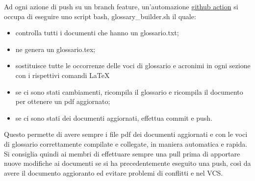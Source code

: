                 Ad ogni azione di push su un branch feature, un'automazione \href{https://docs.github.com/en/free-pro-team@latest/actions}{github action} si occupa di eseguire uno script bash, glossary\_builder.sh il quale:
                \begin{itemize}
                    \item controlla tutti i documenti che hanno un glossario.txt;
                    \item ne genera un glossario.tex;
                    \item sostituisce tutte le occorrenze delle voci di glossario e acronimi in ogni sezione con i rispettivi comandi \LaTeX{}
                    \item se ci sono stati cambiamenti, ricompila il glossario e ricompila il documento per ottenere un pdf aggiornato;
                    \item se ci sono stati dei documenti aggiornati, effettua commit e push.
                \end{itemize}
                Questo permette di avere sempre i file pdf dei documenti aggiornati e con le voci di glossario correttamente compilate e collegate, in maniera automatica e rapida. Si consiglia quindi ai membri di effettuare sempre una pull prima di apportare nuove modifiche ai documenti se si ha precedentemente eseguito una push, così da avere il documento aggioranto ed evitare problemi di conflitti e nel VCS.
